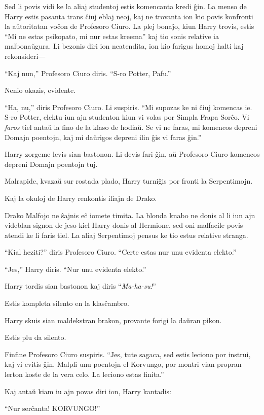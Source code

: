 Sed li povis vidi ke la aliaj studentoj estis komencanta kredi ĝin. La
menso de Harry estis pasanta trans ĉiuj eblaj neoj, kaj ne trovanta
ion kio povis konfronti la aŭtoritatan voĉon de Profesoro Ciuro. La
plej bonaĵo, kiun Harry trovis, estis ``Mi ne estas psikopato, mi nur
estas kreema'' kaj tio sonis relative ia malbonaŭgura. Li bezonis diri
ion neatendita, ion kio farigus homoj halti kaj rekonsideri—

``Kaj nun,'' Profesoro Ciuro diris. ``S-ro Potter, Pafu.''

Nenio okazis, evidente.

``Ha, nu,'' diris Profesoro Ciuro. Li suspiris. ``Mi supozas ke ni
ĉiuj komencas ie. S-ro Potter, elektu iun ajn studenton kiun vi volas
por Simpla Frapa Sorĉo. Vi \emph{faros} tiel antaŭ la fino de la klaso
de hodiaŭ. Se vi ne faras, mi komencos depreni Domajn poentojn, kaj mi
daŭrigos depreni ilin ĝis vi faras ĝin.''

Harry zorgeme levis sian bastonon. Li devis fari ĝin, aŭ Profesoro
Ciuro komencos depreni Domajn poentojn tuj.

Malrapide, kvazaŭ sur rostada plado, Harry turniĝis por fronti la Serpentimojn.

Kaj la okuloj de Harry renkontis iliajn de Drako.

Drako Malfojo ne ŝajnis eĉ iomete timita. La blonda knabo ne donis al
li iun ajn videblan signon de jeso kiel Harry donis al Hermione, sed
oni malfacile povis atendi ke li faris tiel. La aliaj Serpentimoj
pensus ke tio estus relative stranga.

``Kial heziti?'' diris Profesoro Ciuro. ``Certe estas nur unu evidenta elekto.''

``Jes,'' Harry diris. ``Nur unu evidenta elekto.''

Harry tordis sian bastonon kaj diris ``\emph{Ma-ha-su!}''

Estis kompleta silento en la klasĉambro.

Harry skuis sian maldekstran brakon, provante forigi la daŭran pikon.

Estis plu da silento.

Finfine Profesoro Ciuro suspiris. ``Jes, tute sagaca, sed estis
leciono por instrui, kaj vi evitis ĝin. Malpli unu poentojn el
Korvungo, por montri vian propran lerton koste de la vera celo. La
leciono estas finita.''

Kaj antaŭ kiam iu ajn povas diri ion, Harry kantadis:

``Nur serĉanta! KORVUNGO!''

